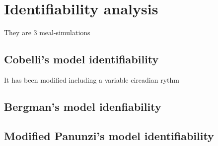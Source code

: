 \chapter{Identifiability analysis}
\label{sec:IdentifiabilityAnalysis}

They are 3 meal-simulations

\section{Cobelli's model identifiability}
\label{sec:CobelliSModelIdentifiability}

It has been modified including a variable circadian rythm

\section{Bergman's model idenfiability}
\label{sec:BergmanSModelIdenfiability}

\section{Modified Panunzi's model identifiability}
\label{sec:ModifiedPanunziSModelIdentifiability}
